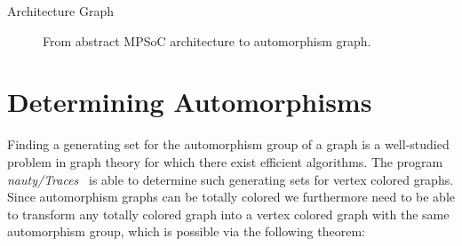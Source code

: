 \begin{exmp}[label=exmp:arch_graph]{Architecture Graph}
\begin{figure}[H]
\begin{subfigure}{.3\textwidth}
      \caption{}
      \label{fig:tcol_simple_arch_graph}
    \end{subfigure}
    \caption{From abstract MPSoC architecture to automorphism graph.}
  \end{figure}
\end{exmp}

\section{Determining Automorphisms}
\label{sec:ag_determining_automorphisms}

Finding a generating set for the automorphism group of a graph is a
well-studied problem in graph theory for which there exist efficient
algorithms. The program \textit{nauty/Traces}~\cite{nauty} is able to determine
such generating sets for vertex colored graphs. Since automorphism graphs can
be totally colored we furthermore need to be able to transform any
totally colored graph into a vertex colored graph with the same automorphism
group, which is possible via the following theorem:

